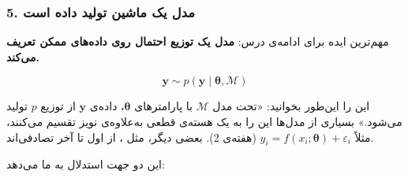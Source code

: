 \subsubsection{5. مدل یک ماشین تولید داده است}

مهم‌ترین ایده برای ادامه‌ی درس: \textbf{مدل یک توزیع احتمال روی داده‌های
ممکن تعریف می‌کند.}

\[
\mathbf{y} \sim p(\mathbf{y} \mid \boldsymbol{\theta}, \mathcal{M})
\]

این را این‌طور بخوانید: «تحت مدل \(\mathcal{M}\) با پارامترهای
\(\boldsymbol{\theta}\)، داده‌ی \(\mathbf{y}\) از توزیع \(p\) تولید
می‌شود.» بسیاری از مدل‌ها این را به یک هسته‌ی قطعی به‌علاوه‌ی نویز تقسیم
می‌کنند، مثلاً \(y_i = f(x_i; \boldsymbol{\theta}) + \varepsilon_i\)
(هفته‌ی 2). بعضی دیگر، مثل ، از اول تا آخر تصادفی‌اند.

این دو جهت استدلال به ما می‌دهد:

